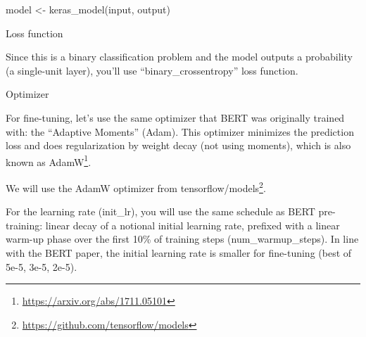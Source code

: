 \documentclass[
]{article}
\newenvironment{Shaded}{}{}
\newcommand{\AttributeTok}[1]{\textcolor[rgb]{0.49,0.56,0.16}{#1}}
\newcommand{\CommentTok}[1]{\textcolor[rgb]{0.38,0.63,0.69}{\textit{#1}}}
\newcommand{\DecValTok}[1]{\textcolor[rgb]{0.25,0.63,0.44}{#1}}
\newcommand{\FloatTok}[1]{\textcolor[rgb]{0.25,0.63,0.44}{#1}}
\newcommand{\FunctionTok}[1]{\textcolor[rgb]{0.02,0.16,0.49}{#1}}
\newcommand{\NormalTok}[1]{#1}
\newcommand{\OtherTok}[1]{\textcolor[rgb]{0.00,0.44,0.13}{#1}}
\newcommand{\SpecialCharTok}[1]{\textcolor[rgb]{0.25,0.44,0.63}{#1}}
\newcommand{\StringTok}[1]{\textcolor[rgb]{0.25,0.44,0.63}{#1}}
\DeclareRobustCommand{\href}[2]{#2\footnote{\url{#1}}}
\begin{document}
\begin{Shaded}
\end{Shaded}

\begin{Shaded}
\begin{Highlighting}[]
\NormalTok{model }\OtherTok{\textless{}{-}} \FunctionTok{keras\_model}\NormalTok{(input, output)}
\end{Highlighting}
\end{Shaded}

Loss function

Since this is a binary classification problem and the model outputs a
probability (a single-unit layer), you'll use ``binary\_crossentropy''
loss function.

Optimizer

For fine-tuning, let's use the same optimizer that BERT was originally
trained with: the ``Adaptive Moments'' (Adam). This optimizer minimizes
the prediction loss and does regularization by weight decay (not using
moments), which is also known as
\href{https://arxiv.org/abs/1711.05101}{AdamW}.

We will use the AdamW optimizer from
\href{https://github.com/tensorflow/models}{tensorflow/models}.

For the learning rate (init\_lr), you will use the same schedule as BERT
pre-training: linear decay of a notional initial learning rate, prefixed
with a linear warm-up phase over the first 10\% of training steps
(num\_warmup\_steps). In line with the BERT paper, the initial learning
rate is smaller for fine-tuning (best of 5e-5, 3e-5, 2e-5).
\end{document}

